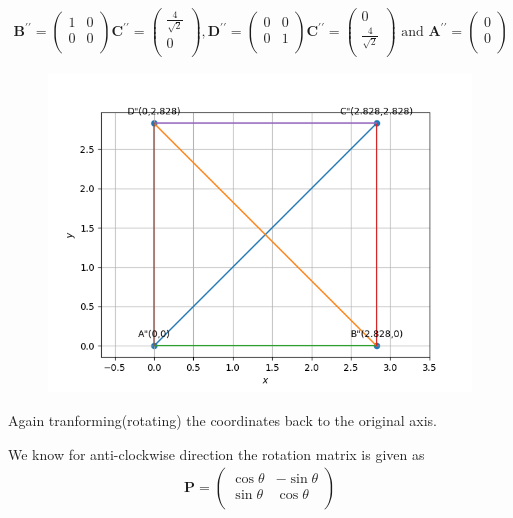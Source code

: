 \documentclass[12pt]{article}
\newcommand{\myvec}[1]{\ensuremath{\begin{pmatrix}#1\end{pmatrix}}}
\let\vec\mathbf
\begin{document}
\begin{align}
\vec{B^{\prime \prime}} = \myvec{
 1&0\\
 0&0\\
}\vec{C^{\prime \prime}}=
\myvec{
 \frac{4}{\sqrt{2}}\\
 0\\
},
\vec{D^{\prime \prime}} = \myvec{
 0&0\\
 0&1\\
}\vec{C^{\prime \prime}}=
\myvec{
 0\\
 \frac{4}{\sqrt{2}}\\
} \text{ and }
\vec{A^{\prime \prime}} =
\myvec{
0 \\
0\\
}
\end{align}
\fi
\begin{figure}[!h]
	\begin{center} 
	    \includegraphics[width=\columnwidth]{chapters/10/7/4/4/figs/square2}
	\end{center}
\caption{}
\label{fig:7/4/4/4Fig3}
\end{figure}

\newpage
\iffalse
Again tranforming(rotating) the coordinates back to the original axis.

We know for anti-clockwise direction the rotation matrix is given as
\begin{align}
\vec{P} =
\myvec{
\cos\theta & -\sin\theta \\
\sin\theta & \cos\theta \\
}
\end{align}
\end{document}
